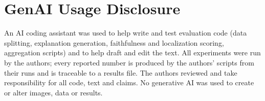 \section*{GenAI Usage Disclosure}
An AI coding assistant was used to help write and test evaluation code (data splitting, explanation
generation, faithfulness and localization scoring, aggregation scripts) and to help draft and edit the text.
All experiments were run by the authors; every reported number is produced by the authors' scripts from their
runs and is traceable to a results file. The authors reviewed and take responsibility for all code,
text and claims. No generative AI was used to create or alter images, data or results.

